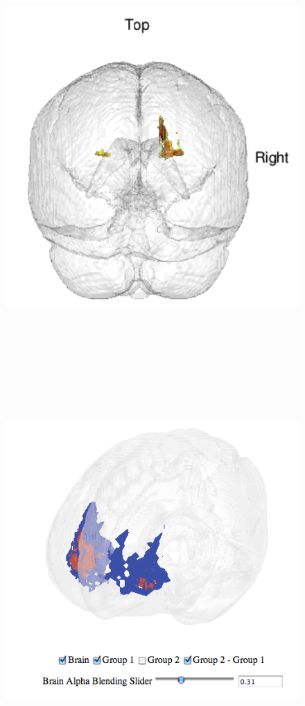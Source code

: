 \documentclass[final]{beamer}\usepackage[]{graphicx}\usepackage[]{color}
\begin{document}
\begin{frame}[fragile]
\begin{multicols}{2}
\begin{figure}
  \begin{minipage}[t]{3.5in}
    \includegraphics[width=6in, height=6in]{snapshot_crop.png}
  \end{minipage}\hfill
  \begin{minipage}[t]{3.5in}
    \includegraphics[width=6in, height=6in]{./figure/4D_snapshot2.png}

\end{minipage}
\end{figure}
\end{multicols}
\end{frame}
\end{document}
